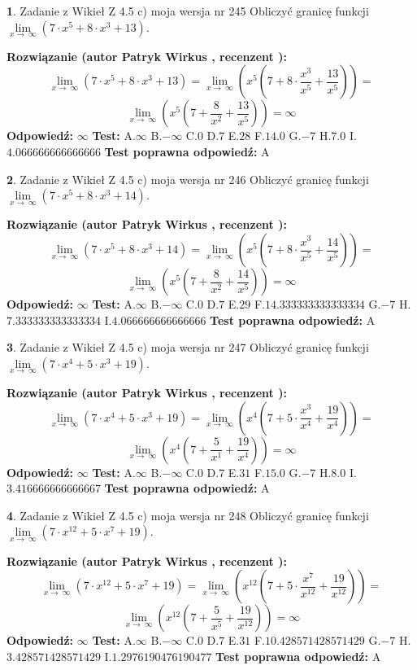 \documentclass[12pt, a4paper]{article}
\theoremstyle{definition} %
\newtheorem{zad}{}
\newcommand{\zadStart}[1]{\begin{zad}#1\newline}
\newcommand{\zadStop}{\end{zad}}
\newcommand{\rozwStart}[2]{\noindent \textbf{Rozwiązanie (autor #1 , recenzent #2): }\newline}
\newcommand{\rozwStop}{\newline}
\newcommand{\odpStart}{\noindent \textbf{Odpowiedź:}\newline}
\newcommand{\odpStop}{\newline}
\newcommand{\testStart}{\noindent \textbf{Test:}\newline}
\newcommand{\testStop}{\newline}
\newcommand{\kluczStart}{\noindent \textbf{Test poprawna odpowiedź:}\newline}
\newcommand{\kluczStop}{\newline}
\begin{document}
\zadStart{Zadanie z Wikieł Z 4.5 c) moja wersja nr 245}
Obliczyć granicę funkcji  $\lim\limits_{x\to\ \infty}(7 \cdot x^{5}+8 \cdot x^{3}+13)$.
\zadStop
\rozwStart{Patryk Wirkus}{}
$$\lim\limits_{x\to\ \infty}(7 \cdot x^{5}+8 \cdot x^{3}+13) = \lim\limits_{x\to\ \infty}(x^{5}(7 +8 \cdot \frac{x^{3}}{x^{5}}+\frac{13}{x^{5}})) =$$ $$\lim\limits_{x\to\ \infty}(x^{5}(7 +\frac{8}{x^{2}}+\frac{13}{x^{5}})) =\infty$$
\rozwStop
\odpStart
$\infty$
\odpStop
\testStart
A.$\infty$ B.$-\infty$ C.$0$ D.$7$ E.$28$
F.$14.0$ G.$-7$
H.$7.0$
I.$4.066666666666666$
\testStop
\kluczStart
A
\kluczStop



\zadStart{Zadanie z Wikieł Z 4.5 c) moja wersja nr 246}
Obliczyć granicę funkcji  $\lim\limits_{x\to\ \infty}(7 \cdot x^{5}+8 \cdot x^{3}+14)$.
\zadStop
\rozwStart{Patryk Wirkus}{}
$$\lim\limits_{x\to\ \infty}(7 \cdot x^{5}+8 \cdot x^{3}+14) = \lim\limits_{x\to\ \infty}(x^{5}(7 +8 \cdot \frac{x^{3}}{x^{5}}+\frac{14}{x^{5}})) =$$ $$\lim\limits_{x\to\ \infty}(x^{5}(7 +\frac{8}{x^{2}}+\frac{14}{x^{5}})) =\infty$$
\rozwStop
\odpStart
$\infty$
\odpStop
\testStart
A.$\infty$ B.$-\infty$ C.$0$ D.$7$ E.$29$
F.$14.333333333333334$ G.$-7$
H.$7.333333333333334$
I.$4.066666666666666$
\testStop
\kluczStart
A
\kluczStop



\zadStart{Zadanie z Wikieł Z 4.5 c) moja wersja nr 247}
Obliczyć granicę funkcji  $\lim\limits_{x\to\ \infty}(7 \cdot x^{4}+5 \cdot x^{3}+19)$.
\zadStop
\rozwStart{Patryk Wirkus}{}
$$\lim\limits_{x\to\ \infty}(7 \cdot x^{4}+5 \cdot x^{3}+19) = \lim\limits_{x\to\ \infty}(x^{4}(7 +5 \cdot \frac{x^{3}}{x^{4}}+\frac{19}{x^{4}})) =$$ $$\lim\limits_{x\to\ \infty}(x^{4}(7 +\frac{5}{x^{1}}+\frac{19}{x^{4}})) =\infty$$
\rozwStop
\odpStart
$\infty$
\odpStop
\testStart
A.$\infty$ B.$-\infty$ C.$0$ D.$7$ E.$31$
F.$15.0$ G.$-7$
H.$8.0$
I.$3.416666666666667$
\testStop
\kluczStart
A
\kluczStop



\zadStart{Zadanie z Wikieł Z 4.5 c) moja wersja nr 248}
Obliczyć granicę funkcji  $\lim\limits_{x\to\ \infty}(7 \cdot x^{12}+5 \cdot x^{7}+19)$.
\zadStop
\rozwStart{Patryk Wirkus}{}
$$\lim\limits_{x\to\ \infty}(7 \cdot x^{12}+5 \cdot x^{7}+19) = \lim\limits_{x\to\ \infty}(x^{12}(7 +5 \cdot \frac{x^{7}}{x^{12}}+\frac{19}{x^{12}})) =$$ $$\lim\limits_{x\to\ \infty}(x^{12}(7 +\frac{5}{x^{5}}+\frac{19}{x^{12}})) =\infty$$
\rozwStop
\odpStart
$\infty$
\odpStop
\testStart
A.$\infty$ B.$-\infty$ C.$0$ D.$7$ E.$31$
F.$10.428571428571429$ G.$-7$
H.$3.428571428571429$
I.$1.2976190476190477$
\testStop
\kluczStart
A
\kluczStop
\end{document}
